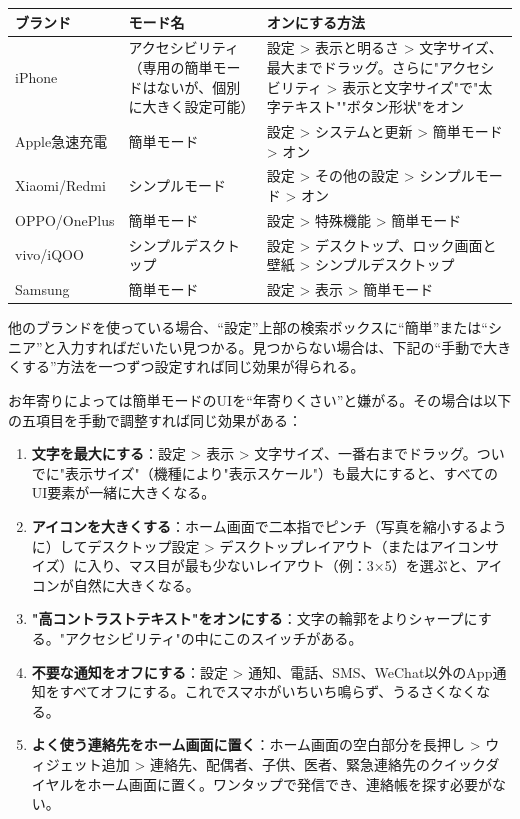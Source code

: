 
\begin{center}
\begin{tabularx}{\linewidth}{|X|X|X|}
\hline
\textbf{ブランド} & \textbf{モード名} & \textbf{オンにする方法} \tabularnewline
\hline
iPhone & アクセシビリティ（専用の簡単モードはないが、個別に大きく設定可能） & 設定 > 表示と明るさ > 文字サイズ、最大までドラッグ。さらに"アクセシビリティ > 表示と文字サイズ"で"太字テキスト""ボタン形状"をオン \tabularnewline
Apple急速充電 & 簡単モード & 設定 > システムと更新 > 簡単モード > オン \tabularnewline
Xiaomi/Redmi & シンプルモード & 設定 > その他の設定 > シンプルモード > オン \tabularnewline
OPPO/OnePlus & 簡単モード & 設定 > 特殊機能 > 簡単モード \tabularnewline
vivo/iQOO & シンプルデスクトップ & 設定 > デスクトップ、ロック画面と壁紙 > シンプルデスクトップ \tabularnewline
Samsung & 簡単モード & 設定 > 表示 > 簡単モード \tabularnewline
\hline
\end{tabularx}
\end{center}

他のブランドを使っている場合、“設定”上部の検索ボックスに“簡単”または“シニア”と入力すればだいたい見つかる。見つからない場合は、下記の“手動で大きくする”方法を一つずつ設定すれば同じ効果が得られる。


お年寄りによっては簡単モードのUIを“年寄りくさい”と嫌がる。その場合は以下の五項目を手動で調整すれば同じ効果がある：

\begin{enumerate}
  \item \textbf{文字を最大にする}：設定 > 表示 > 文字サイズ、一番右までドラッグ。ついでに"表示サイズ"（機種により"表示スケール"）も最大にすると、すべてのUI要素が一緒に大きくなる。
  \item \textbf{アイコンを大きくする}：ホーム画面で二本指でピンチ（写真を縮小するように）してデスクトップ設定 > デスクトップレイアウト（またはアイコンサイズ）に入り、マス目が最も少ないレイアウト（例：3×5）を選ぶと、アイコンが自然に大きくなる。
  \item \textbf{"高コントラストテキスト"をオンにする}：文字の輪郭をよりシャープにする。"アクセシビリティ"の中にこのスイッチがある。
  \item \textbf{不要な通知をオフにする}：設定 > 通知、電話、SMS、WeChat以外のApp通知をすべてオフにする。これでスマホがいちいち鳴らず、うるさくなくなる。
  \item \textbf{よく使う連絡先をホーム画面に置く}：ホーム画面の空白部分を長押し > ウィジェット追加 > 連絡先、配偶者、子供、医者、緊急連絡先のクイックダイヤルをホーム画面に置く。ワンタップで発信でき、連絡帳を探す必要がない。
\end{enumerate}


